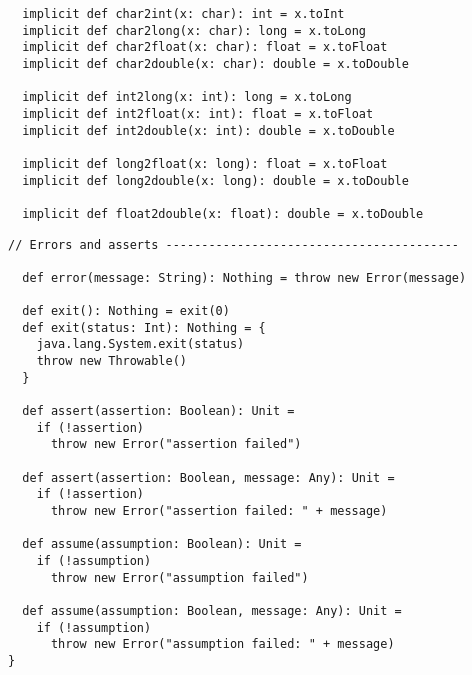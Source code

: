{\begin{lstlisting}
  implicit def char2int(x: char): int = x.toInt
  implicit def char2long(x: char): long = x.toLong
  implicit def char2float(x: char): float = x.toFloat
  implicit def char2double(x: char): double = x.toDouble

  implicit def int2long(x: int): long = x.toLong
  implicit def int2float(x: int): float = x.toFloat
  implicit def int2double(x: int): double = x.toDouble

  implicit def long2float(x: long): float = x.toFloat
  implicit def long2double(x: long): double = x.toDouble

  implicit def float2double(x: float): double = x.toDouble
\end{lstlisting}
\newpage
\begin{lstlisting}
// Errors and asserts -----------------------------------------

  def error(message: String): Nothing = throw new Error(message)

  def exit(): Nothing = exit(0)
  def exit(status: Int): Nothing = {
    java.lang.System.exit(status)
    throw new Throwable()
  }

  def assert(assertion: Boolean): Unit =
    if (!assertion)
      throw new Error("assertion failed")

  def assert(assertion: Boolean, message: Any): Unit =
    if (!assertion)
      throw new Error("assertion failed: " + message)

  def assume(assumption: Boolean): Unit =
    if (!assumption)
      throw new Error("assumption failed")

  def assume(assumption: Boolean, message: Any): Unit =
    if (!assumption)
      throw new Error("assumption failed: " + message)
}
\end{lstlisting}

}

